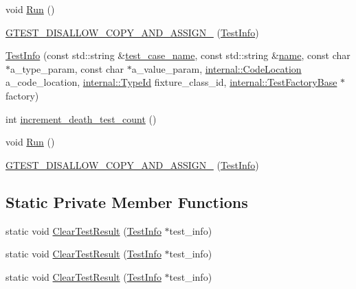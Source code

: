 \begin{DoxyCompactItemize}
\item 
void \mbox{\hyperlink{classtesting_1_1_test_info_ade784915e9be3a01e3a6ef509b77d6c9}{Run}} ()
\item 
\mbox{\hyperlink{classtesting_1_1_test_info_a49607d4547e374b5248e4200d9192817}{G\+T\+E\+S\+T\+\_\+\+D\+I\+S\+A\+L\+L\+O\+W\+\_\+\+C\+O\+P\+Y\+\_\+\+A\+N\+D\+\_\+\+A\+S\+S\+I\+G\+N\+\_\+}} (\mbox{\hyperlink{classtesting_1_1_test_info}{Test\+Info}})
\item 
\mbox{\hyperlink{classtesting_1_1_test_info_afc4a66e2d2491f09e8549c71514c3d78}{Test\+Info}} (const std\+::string \&\mbox{\hyperlink{classtesting_1_1_test_info_a036a20710c8c2252889544daba9a8ff9}{test\+\_\+case\+\_\+name}}, const std\+::string \&\mbox{\hyperlink{classtesting_1_1_test_info_ac2581b45eccc9a3b94cb41c4807d0e34}{name}}, const char $\ast$a\+\_\+type\+\_\+param, const char $\ast$a\+\_\+value\+\_\+param, \mbox{\hyperlink{structtesting_1_1internal_1_1_code_location}{internal\+::\+Code\+Location}} a\+\_\+code\+\_\+location, \mbox{\hyperlink{namespacetesting_1_1internal_a38c435cbab5f8b784e2e7f3356cab242}{internal\+::\+Type\+Id}} fixture\+\_\+class\+\_\+id, \mbox{\hyperlink{classtesting_1_1internal_1_1_test_factory_base}{internal\+::\+Test\+Factory\+Base}} $\ast$factory)
\item 
int \mbox{\hyperlink{classtesting_1_1_test_info_a70c9509202a6f95fbc26704ce13efb63}{increment\+\_\+death\+\_\+test\+\_\+count}} ()
\item 
void \mbox{\hyperlink{classtesting_1_1_test_info_ade784915e9be3a01e3a6ef509b77d6c9}{Run}} ()
\item 
\mbox{\hyperlink{classtesting_1_1_test_info_a49607d4547e374b5248e4200d9192817}{G\+T\+E\+S\+T\+\_\+\+D\+I\+S\+A\+L\+L\+O\+W\+\_\+\+C\+O\+P\+Y\+\_\+\+A\+N\+D\+\_\+\+A\+S\+S\+I\+G\+N\+\_\+}} (\mbox{\hyperlink{classtesting_1_1_test_info}{Test\+Info}})
\end{DoxyCompactItemize}
\subsection*{Static Private Member Functions}
\begin{DoxyCompactItemize}
\item 
static void \mbox{\hyperlink{classtesting_1_1_test_info_ac6d80865a3e68478aaf167058e6ca5c2}{Clear\+Test\+Result}} (\mbox{\hyperlink{classtesting_1_1_test_info}{Test\+Info}} $\ast$test\+\_\+info)
\item 
static void \mbox{\hyperlink{classtesting_1_1_test_info_ac6d80865a3e68478aaf167058e6ca5c2}{Clear\+Test\+Result}} (\mbox{\hyperlink{classtesting_1_1_test_info}{Test\+Info}} $\ast$test\+\_\+info)
\item 
static void \mbox{\hyperlink{classtesting_1_1_test_info_ac6d80865a3e68478aaf167058e6ca5c2}{Clear\+Test\+Result}} (\mbox{\hyperlink{classtesting_1_1_test_info}{Test\+Info}} $\ast$test\+\_\+info)
\end{DoxyCompactItemize}
